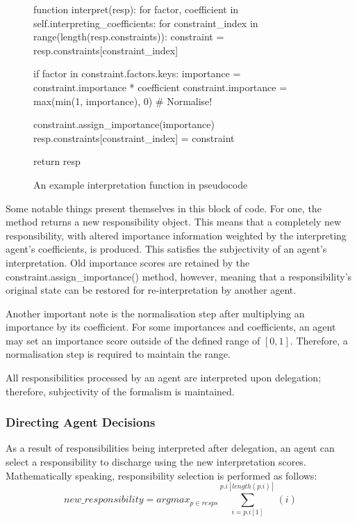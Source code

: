 \begin{figure}[h]
    \centering
    \begin{pseudocodelisting}
    function interpret(resp):
        for factor, coefficient in self.interpreting_coefficients:
            for constraint_index in range(length(resp.constraints)):
                constraint = resp.constraints[constraint_index]

                if factor in constraint.factors.keys:
                    importance = constraint.importance * coefficient
                    constraint.importance = max(min(1, importance), 0)  # Normalise!

                constraint.assign_importance(importance)
                resp.constraints[constraint_index] = constraint

        return resp
    \end{pseudocodelisting}
    \caption{An example interpretation function in pseudocode}
    \label{code:interpretation_function}
\end{figure}

Some notable things present themselves in this block of code. For one, the method returns a new responsibility object. This means that a completely new responsibility, with altered importance information weighted by the interpreting agent's coefficients, is produced. This satisfies the subjectivity of an agent's interpretation. Old importance scores are retained by the constraint.assign\_importance() method, however, meaning that a responsibility's original state can be restored for re-interpretation by another agent.\par

Another important note is the normalisation step after multiplying an importance by its coefficient. For some importances and coefficients, an agent may set an importance score outside of the defined range of \([0,1]\). Therefore, a normalisation step is required to maintain the range.\par

All responsibilities processed by an agent are interpreted upon delegation; therefore, subjectivity of the formalism is maintained.\par

\subsubsection{Directing Agent Decisions}  %
As a result of responsibilities being interpreted after delegation, an agent can select a responsibility to discharge using the new interpretation scores. Mathematically speaking, responsibility selection is performed as follows: \[new\_responsibility = argmax_{p \in resps} {\sum_{i=p.i[1]}^{p.i[length(p.i)]}(i)}\]

